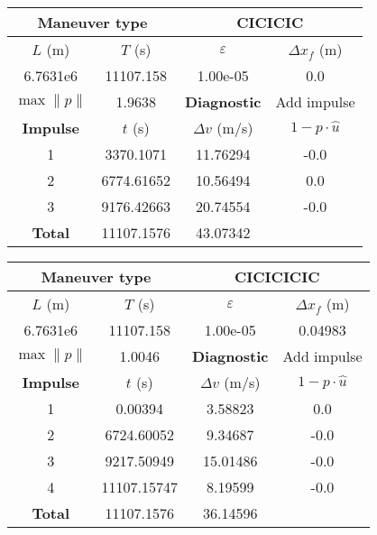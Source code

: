 \begin{table}[htpb]
    \centering
    \begin{tabular}{cccc} \toprule
    \multicolumn{2}{c}{\textbf{Maneuver type}} & \multicolumn{2}{c}{CICICIC} \\ \midrule
    \(L\) (m) & \(T\) (s) & \(\varepsilon\) & \(\Delta x_{f}\) (m)    \\ \midrule
    6.7631e6          & 11107.158          & 1.00e-05                & 0.0                        \\ \midrule
    \(\max \lVert p \rVert\) & 1.9638     & \textbf{Diagnostic}   & Add impulse        \\ \midrule
    \textbf{Impulse} & \(t\) (s) & \(\Delta v\) (m/s) & \(1 - p \cdot \hat{u}\) \\ \midrule
    1                 & 3370.1071          & 11.76294             & -0.0                    \\
    2                 & 6774.61652          & 10.56494             & 0.0                    \\
    3                 & 9176.42663          & 20.74554             & -0.0                    \\\midrule
    \textbf{Total}   & 11107.1576          & 43.07342             &                     \\ \bottomrule   
    \end{tabular}
\end{table}


\begin{table}[htpb]
    \centering
    \begin{tabular}{cccc} \toprule
    \multicolumn{2}{c}{\textbf{Maneuver type}} & \multicolumn{2}{c}{CICICICIC} \\ \midrule
    \(L\) (m) & \(T\) (s) & \(\varepsilon\) & \(\Delta x_{f}\) (m)    \\ \midrule
    6.7631e6          & 11107.158          & 1.00e-05                & 0.04983                        \\ \midrule
    \(\max \lVert p \rVert\) & 1.0046     & \textbf{Diagnostic}   & Add impulse        \\ \midrule
    \textbf{Impulse} & \(t\) (s) & \(\Delta v\) (m/s) & \(1 - p \cdot \hat{u}\) \\ \midrule
    1                 & 0.00394          & 3.58823             & 0.0                    \\
    2                 & 6724.60052          & 9.34687             & -0.0                    \\
    3                 & 9217.50949          & 15.01486             & -0.0                    \\
    4                 & 11107.15747          & 8.19599             & -0.0                    \\\midrule
    \textbf{Total}   & 11107.1576          & 36.14596             &                     \\ \bottomrule   
    \end{tabular}
\end{table}


